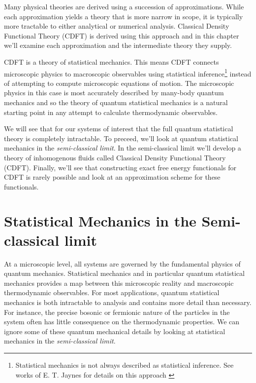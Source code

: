 \label{chapter:cdft_intro}

Many physical theories are derived using a succession of approximations. While
each approximation yields a theory that is more narrow in scope, it is
typically more tractable to either analytical or numerical analysis.  Classical
Density Functional Theory (CDFT) is derived using this approach and in this
chapter we'll examine each approximation and the intermediate theory they
supply. 

CDFT is a theory of statistical mechanics. This means CDFT connects microscopic
physics to macroscopic observables using statistical
inference\footnote{Statistical mechanics is not always described as statistical
inference. See works of E. T. Jaynes for details on this approach
\cite{JAYNES57}} instead of attempting to compute microscopic equations of
motion. The microscopic physics in this case is most accurately described by
many-body quantum mechanics and so the theory of quantum statistical mechanics
is a natural starting point in any attempt to calculate thermodynamic
observables.

We will see that for our systems of interest that the full quantum statistical
theory is completely intractable. To preceed, we'll look at quantum statistical
mechanics in the \textit{semi-classical limit}. In the semi-classical limit
we'll develop a theory of inhomogenous fluids called Classical Density
Functional Theory (CDFT). Finally, we'll see that constructing exact free
energy functionals for CDFT is rarely possible and look at an approximation
scheme for these functionals.

\section{Statistical Mechanics in the Semi-classical limit} %

At a microscopic level, all systems are governed by the fundamental physics of
quantum mechanics. Statistical mechanics and in particular quantum statistical
mechanics provides a map between this microscopic reality and macroscopic
thermodynamic observables. For most applications, quantum statistical mechanics
is both intractable to analysis and contains more detail than necessary. For
instance, the precise bosonic or fermionic nature of the particles in the
system often has little consequence on the thermodynamic properties.  We can
ignore some of these quantum mechanical details by looking at statistical
mechanics in the \textit{semi-classical limit}.

